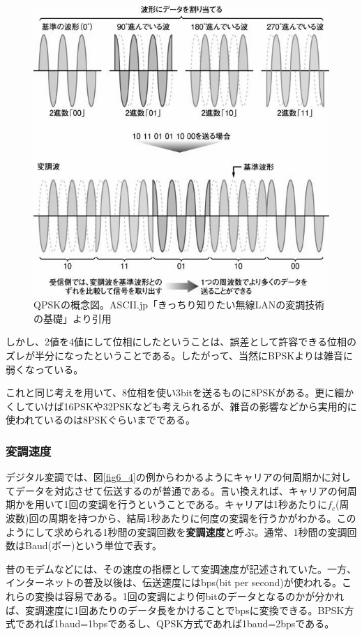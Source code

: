 \begin{figure}[htb]
\centering
\includegraphics[width=0.8\linewidth,keepaspectratio,bb=0 0 588 575]{fig/fig6_6.jpg}
\caption{QPSKの概念図。ASCII.jp「きっちり知りたい無線LANの変調技術の基礎」より引用}\label{fig6_6}
\end{figure}

しかし、2値を4値にして位相にしたということは、誤差として許容できる位相のズレが半分になったということである。したがって、当然にBPSKよりは雑音に弱くなっている。

これと同じ考えを用いて、8位相を使い3bitを送るものに8PSKがある。更に細かくしていけば16PSKや32PSKなども考えられるが、雑音の影響などから実用的に使われているのは8PSKぐらいまでである。

\subsubsection{変調速度}

デジタル変調では、図\ref{fig6_4}の例からわかるようにキャリアの何周期かに対してデータを対応させて伝送するのが普通である。言い換えれば、キャリアの何周期かを用いて1回の変調を行うということである。キャリアは1秒あたりに$f_c$(周波数)回の周期を持つから、結局1秒あたりに何度の変調を行うかがわかる。このようにして求められる1秒間の変調回数を\textbf{変調速度}と呼ぶ。通常、1秒間の変調回数はBaud(ボー)という単位で表す。

昔のモデムなどには、その速度の指標として変調速度が記述されていた。一方、インターネットの普及以後は、伝送速度にはbps(bit per second)が使われる。これらの変換は容易である。1回の変調により何bitのデータとなるのかが分かれば、変調速度に1回あたりのデータ長をかけることでbpsに変換できる。BPSK方式であれば1baud=1bpsであるし、QPSK方式であれば1baud=2bpsである。

